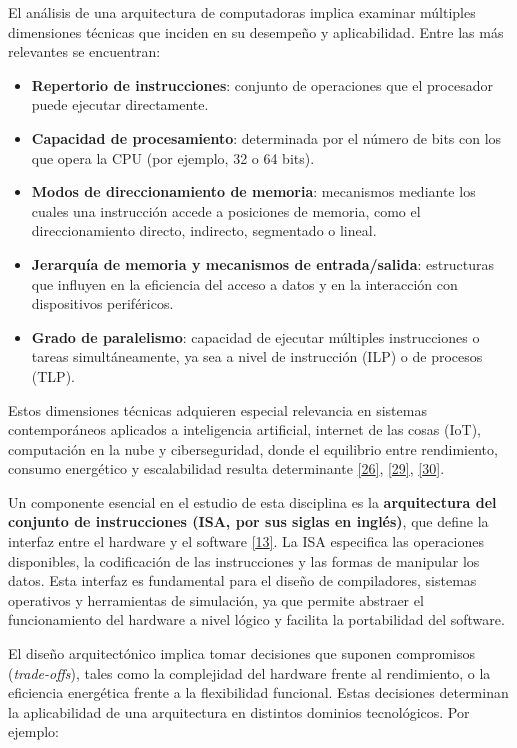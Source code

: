 \documentclass[12pt,oneside]{templates/unerthesis}
\providecommand{\tightlist}{%
  \setlength{\itemsep}{0pt}\setlength{\parskip}{0pt}}
\begin{document}
El análisis de una arquitectura de computadoras implica examinar múltiples dimensiones técnicas que inciden en su desempeño y aplicabilidad. Entre las más relevantes se encuentran:

\begin{itemize}
\tightlist
\item
  \textbf{Repertorio de instrucciones}: conjunto de operaciones que el procesador puede ejecutar directamente.
\item
  \textbf{Capacidad de procesamiento}: determinada por el número de bits con los que opera la CPU (por ejemplo, 32 o 64 bits).
\item
  \textbf{Modos de direccionamiento de memoria}: mecanismos mediante los cuales una instrucción accede a posiciones de memoria, como el direccionamiento directo, indirecto, segmentado o lineal.
\item
  \textbf{Jerarquía de memoria y mecanismos de entrada/salida}: estructuras que influyen en la eficiencia del acceso a datos y en la interacción con dispositivos periféricos.
\item
  \textbf{Grado de paralelismo}: capacidad de ejecutar múltiples instrucciones o tareas simultáneamente, ya sea a nivel de instrucción (ILP) o de procesos (TLP).
\end{itemize}

Estos dimensiones técnicas adquieren especial relevancia en sistemas contemporáneos aplicados a inteligencia artificial, internet de las cosas (IoT), computación en la nube y ciberseguridad, donde el equilibrio entre rendimiento, consumo energético y escalabilidad resulta determinante \protect\hyperlink{ref-harris2015digital}{{[}26{]}}, \protect\hyperlink{ref-patterson_computer_2016}{{[}29{]}}, \protect\hyperlink{ref-belli2020iot}{{[}30{]}}.

Un componente esencial en el estudio de esta disciplina es la \textbf{arquitectura del conjunto de instrucciones (ISA, por sus siglas en inglés)}, que define la interfaz entre el hardware y el software \protect\hyperlink{ref-hennessy2017computer}{{[}13{]}}. La ISA especifica las operaciones disponibles, la codificación de las instrucciones y las formas de manipular los datos. Esta interfaz es fundamental para el diseño de compiladores, sistemas operativos y herramientas de simulación, ya que permite abstraer el funcionamiento del hardware a nivel lógico y facilita la portabilidad del software.

El diseño arquitectónico implica tomar decisiones que suponen compromisos (\emph{trade-offs}), tales como la complejidad del hardware frente al rendimiento, o la eficiencia energética frente a la flexibilidad funcional. Estas decisiones determinan la aplicabilidad de una arquitectura en distintos dominios tecnológicos. Por ejemplo:
\end{document}
